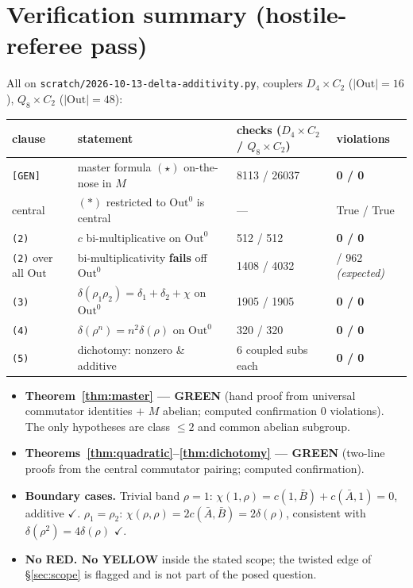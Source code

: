 \documentclass[11pt]{article}
\theoremstyle{definition}
\newcommand{\Out}{\mathrm{Out}}
\begin{document}
\section{Verification summary (hostile-referee pass)}\label{sec:verif}

All on \texttt{scratch/2026-10-13-delta-additivity.py}, couplers $D_4\times C_2$
($|\!\Out|=16$), $Q_8\times C_2$ ($|\!\Out|=48$):

\begin{center}
\renewcommand{\arraystretch}{1.3}
\begin{tabular}{>{\raggedright}p{}>{\raggedright}p{}>{\raggedright}p{}>{\raggedright\arraybackslash}p{}}
\hline
\textbf{clause} & \textbf{statement} & \textbf{checks ($D_4{\times}C_2$ / $Q_8{\times}C_2$)} & \textbf{violations}\\
\hline
\texttt{[GEN]} & master formula $(\star)$ on-the-nose in $M$ & 8113 / 26037 & \textbf{0 / 0}\\
central & $(\ast)$ restricted to $\Out^0$ is central & --- & True / True\\
\texttt{(2)} & $c$ bi-multiplicative on $\Out^0$ & 512 / 512 & \textbf{0 / 0}\\
\texttt{(2)} over all $\Out$ & bi-multiplicativity \textbf{fails} off $\Out^0$ & 1408 / 4032 & 112 / 962 \emph{(expected)}\\
\texttt{(3)} & $\delta(\rho_1\rho_2)=\delta_1+\delta_2+\chi$ on $\Out^0$ & 1905 / 1905 & \textbf{0 / 0}\\
\texttt{(4)} & $\delta(\rho^n)=n^2\delta(\rho)$ on $\Out^0$ & 320 / 320 & \textbf{0 / 0}\\
\texttt{(5)} & dichotomy: nonzero \& additive & 6 coupled subs each & \textbf{0 / 0}\\
\hline
\end{tabular}
\end{center}

\begin{itemize}
\item \textbf{Theorem~\ref{thm:master} --- GREEN} (hand proof from universal commutator
identities $+$ $M$ abelian; computed confirmation $0$ violations). The only hypotheses
are class $\le2$ and common abelian subgroup.
\item \textbf{Theorems~\ref{thm:quadratic}--\ref{thm:dichotomy} --- GREEN} (two-line
proofs from the central commutator pairing; computed confirmation).
\item \textbf{Boundary cases.} Trivial band $\rho=1$:
$\chi(1,\rho)=c(1,\bar B)+c(\bar A,1)=0$, additive $\checkmark$. $\rho_1=\rho_2$:
$\chi(\rho,\rho)=2c(\bar A,\bar B)=2\delta(\rho)$, consistent with
$\delta(\rho^2)=4\delta(\rho)$ $\checkmark$.
\item \textbf{No RED. No YELLOW} inside the stated scope; the twisted edge of
\S\ref{sec:scope} is flagged and is not part of the posed question.
\end{itemize}
\end{document}
